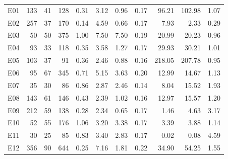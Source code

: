 \documentclass[sigconf,review]{acmart}
\begin{document}
\begin{table}[]
\begin{tabular}{crrrrrrrrrr}
			E01 & 133 & 41 & 128 & 0.31 & 3.12 & 0.96 & 0.17 & 96.21 & 102.98 & 1.07 \\
			E02 & 257 & 37 & 170 & 0.14 & 4.59 & 0.66 & 0.17 & 7.93 & 2.33 & 0.29 \\
			E03 & 50 & 50 & 375 & 1.00 & 7.50 & 7.50 & 0.19 & 20.99 & 20.23 & 0.96 \\
			E04 & 93 & 33 & 118 & 0.35 & 3.58 & 1.27 & 0.17 & 29.93 & 30.21 & 1.01 \\
			E05 & 103 & 37 & 91 & 0.36 & 2.46 & 0.88 & 0.16 & 218.05 & 207.78 & 0.95 \\
			E06 & 95 & 67 & 345 & 0.71 & 5.15 & 3.63 & 0.20 & 12.99 & 14.67 & 1.13 \\
			E07 & 35 & 30 & 86 & 0.86 & 2.87 & 2.46 & 0.14 & 8.04 & 15.52 & 1.93 \\
			E08 & 143 & 61 & 146 & 0.43 & 2.39 & 1.02 & 0.16 & 12.97 & 15.57 & 1.20 \\
			E09 & 212 & 59 & 138 & 0.28 & 2.34 & 0.65 & 0.17 & 1.46 & 4.63 & 3.17 \\
			E10 & 52 & 55 & 176 & 1.06 & 3.20 & 3.38 & 0.17 & 3.39 & 3.88 & 1.14 \\
			E11 & 30 & 25 & 85 & 0.83 & 3.40 & 2.83 & 0.17 & 0.02 & 0.08 & 4.59 \\
			E12 & 356 & 90 & 644 & 0.25 & 7.16 & 1.81 & 0.22 & 34.90 & 54.25 & 1.55 \\
			\hline
		\end{tabular}
	\end{table}
	
\end{document}
